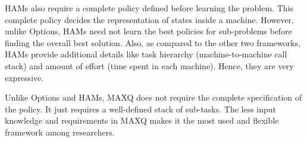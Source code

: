 HAMs also require a complete policy defined before learning the problem. This complete policy decides the representation of states inside a machine. However, unlike Options, HAMs need not learn the best policies for sub-problems before finding the overall best solution. Also, as compared to the other two frameworks, HAMs provide additional details like task hierarchy (machine-to-machine call stack) and amount of effort (time spent in each machine). Hence, they are very expressive. 

Unlike Options and HAMs, MAXQ does not require the complete specification of the policy. It just requires a well-defined stack of sub-tasks. The less input knowledge and requirements in MAXQ makes it the most used and flexible framework among researchers.

